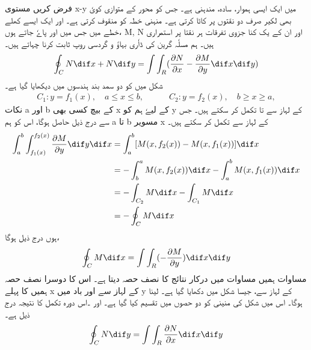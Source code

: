  فرض کریں مستوی x-y میں    ایک ایسی ہموار، سادہ، مندہنی ہے۔ جس کو محور کے متوازی کویٗ بھی لکیر صرف دو نقتوں پر کاٹا کرتی ہے۔ منہنی    خطہ    کو  منقوف کرتی ہے۔ اور ایک ایسے کھلے خطے میں جس میں   اور   پاےٗ جاتے ہوں،  M, N اور ان کے یک کنا جزوی تفرقات ہر نقتا پر استمراری ہیں۔ ہم مسلٗہ گرین کی ڈاٗری بہاوٗ و گردسی روپ ثابت کرنا چہاتے ہیں۔  
\begin{align*}
     \oint_C N \dif x + N \dif y = \int \int_R (\frac{\partial N}{\partial x} - \frac{\partial M}{\partial y} \dif x \dif y) 
\end{align*}
 شکل       میں   کو دو سمد بند ہندسوں میں دیکھایا گیا ہے۔  
\begin{align*}
     C_1: y = f_1(x), \quad  a \leq x \leq b, \quad\quad\quad C_2:  y = f_2(x), \quad  b \geq x \geq a, 
\end{align*}
 نکات a اور  b کے بیچ کسی بھی  x کے لیےٗ ہم   کو  y  کے لہاز سے   تا   تکمل کر سکتے ہیں۔ جس سے درج ذیل حاصل ہوگا،   اس کو ہم  a  تا  b  مسویر x  کے لہاز سے تکمل کر سکتے ہیں۔ 
\begin{align*}
\int_a^b \int_{f_1(x)}^{f_2(x)}\frac{\partial M}{\partial y} \dif y \dif x&= \int_{a}^{b}[M(x, f_2(x)) - M(x, f_1(x))] \dif x \\     &= - \int_{b}^{a} M(x, f_2(x)) \dif x - \int_{a}^{b} M(x, f_1(x)) \dif x \\     &= - \int_{C_2} M \dif x -\int_{C_1} M \dif x \\     &= -\oint_C M \dif x 
\end{align*}
 ہوں درج ذیل ہوگا، 
\begin{align*}
     \oint_C M \dif x = \int \int_R (-\frac{\partial M}{\partial y}) \dif x \dif y 
\end{align*}
 مساوات     ہمیں مساوات    میں درکار نتائج کا نصف حصہ دیتا ہے۔ اس کا دوسرا نصف  حصہ ہمیں  کا پہلے x کے لہاز سے اور باد میں y کے لہاز سے، جیسا شکل     میں دکھایا گیا ہے۔ لینا ہوگا۔ اس میں شکل    کی منینی   کو  دو حصوں میں تقسیم کیا گیا ہے۔   اور  ۔اس دورہ تکمل کا نتیجہ درج ذیل ہے۔ 
\begin{align}
     \oint_C N \dif y = \int \int_R \frac{\partial N}{\partial x} \dif x \dif y 
\end{align}
